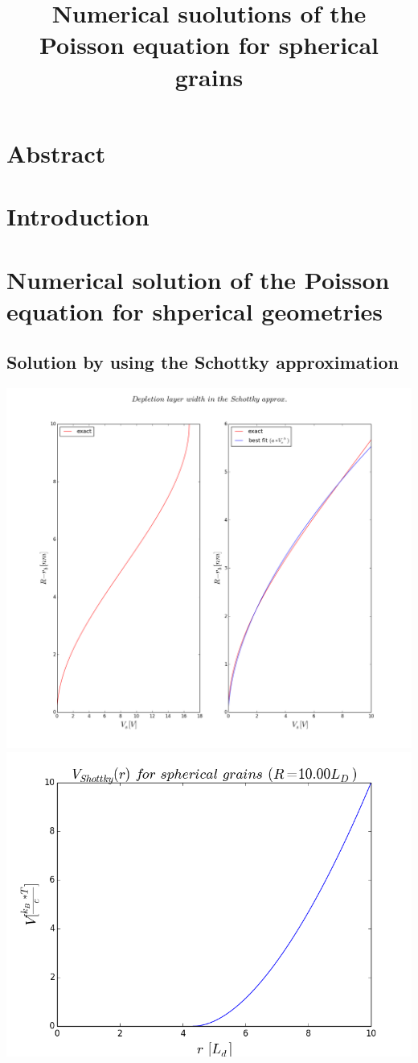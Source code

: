 \documentclass[10pt,a4paper]{article}
\title{Numerical suolutions of the Poisson equation for spherical grains}
\begin{document}
\section{Abstract}

\section{Introduction}

\section{Numerical solution of the Poisson equation for shperical geometries}
\subsection{Solution by using the Schottky approximation}
\includegraphics[width=\textwidth]{png/excat+bestFit_depl_layer_width_vs_vs.png} 
\includegraphics[width=\textwidth]{png/schottky_10LD.png} 
\end{document}
